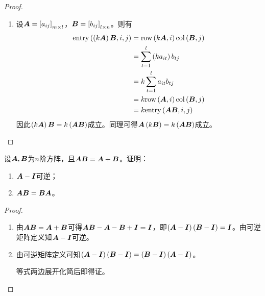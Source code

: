 \begin{proof}
\begin{enumerate}
        \item
              {
              设\(\boldsymbol{A}=\left[ a_{ij} \right]_{m\times l}\)，\(\boldsymbol{B}=\left[ b_{ij} \right]_{l\times n}\)。则有
              \begin{align*}
                  \mathrm{entry}\left( \left( k\boldsymbol{A} \right)\boldsymbol{B},i,j \right) & =\mathrm{row}\left( k\boldsymbol{A},i \right)\mathrm{col}\left( \boldsymbol{B},j \right)     \\
                                                    & =\sum_{t=1}^l\left( ka_{it} \right)b_{tj} \\
                                                    & =k\sum_{t=1}^la_{it}b_{tj}         \\
                                                    & =k\mathrm{row}\left( \boldsymbol{A},i \right)\mathrm{col}\left( \boldsymbol{B},j \right)     \\
                                                    & =k\mathrm{entry}\left( \boldsymbol{A}\boldsymbol{B},i,j \right)
              \end{align*}
              因此\(\left( k\boldsymbol{A} \right)\boldsymbol{B}=k\left( \boldsymbol{A}\boldsymbol{B} \right)\)成立。同理可得\(\boldsymbol{A}\left( k\boldsymbol{B} \right)=k\left( \boldsymbol{A}\boldsymbol{B} \right)\)成立。
              }
    \end{enumerate}
\end{proof}

\begin{suplprob}\label{supl-1.1}
    设\(\boldsymbol{A},\boldsymbol{B}\)为\(n\)阶方阵，且\(\boldsymbol{A}\boldsymbol{B}=\boldsymbol{A}+\boldsymbol{B}\)。证明：
    \begin{enumerate}
        \item \(\boldsymbol{A}-\boldsymbol{I}\)可逆；
        \item \(\boldsymbol{A}\boldsymbol{B}=\boldsymbol{B}\boldsymbol{A}\)。
    \end{enumerate}
\end{suplprob}
\begin{proof}
    \begin{enumerate}
        \item
              {
              由\(\boldsymbol{A}\boldsymbol{B}=\boldsymbol{A}+\boldsymbol{B}\)可得\(\boldsymbol{A}\boldsymbol{B}-\boldsymbol{A}-\boldsymbol{B}+\boldsymbol{I}=\boldsymbol{I}\)，即\(\left( \boldsymbol{A}-\boldsymbol{I} \right)\left( \boldsymbol{B}-\boldsymbol{I} \right)=\boldsymbol{I}\)。由可逆矩阵定义知\(\boldsymbol{A}-\boldsymbol{I}\)可逆。
              }
        \item
              {
              由可逆矩阵定义可知\(\left( \boldsymbol{A}-\boldsymbol{I} \right)\left( \boldsymbol{B}-\boldsymbol{I} \right)=\left( \boldsymbol{B}-\boldsymbol{I} \right)\left( \boldsymbol{A}-\boldsymbol{I} \right)\)。

              等式两边展开化简后即得证。
              }
    \end{enumerate}
\end{proof}

